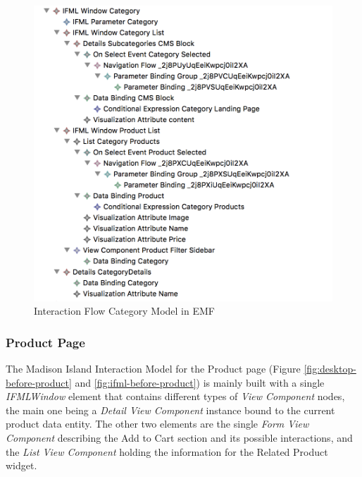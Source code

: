 \vspace{0.5cm}
\begin{figure}[H]
  \centering
    \includegraphics[width=13cm]{images/diagrams/before/ifml-hierarchy-category.png}
  \caption{Interaction Flow Category Model in EMF}
  \label{fig:ifml-before-hierarchy-category}
\end{figure}
\vspace{0.5cm}

\newpage
\subsubsection{Product Page}

The Madison Island Interaction Model for the Product page (Figure \ref{fig:desktop-before-product} and \ref{fig:ifml-before-product}) is mainly built with a single \textit{IFMLWindow} element that contains different types of \textit{View Component} nodes, the main one being a \textit{Detail View Component} instance bound to the current product data entity. The other two elements are the single \textit{Form View Component} describing the Add to Cart section and its possible interactions, and the \textit{List View Component} holding the information for the Related Product widget.

